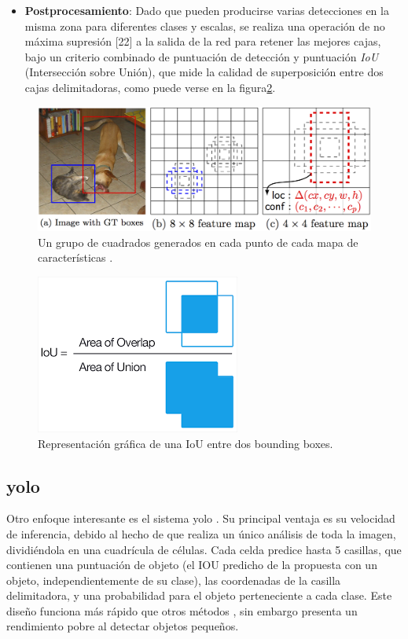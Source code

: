\begin{itemize}
  \item \textbf{Postprocesamiento}: Dado que pueden producirse varias detecciones en la misma zona para diferentes clases y escalas, se realiza una operación de no máxima supresión [22] a la salida de la red para retener las mejores cajas, bajo un criterio combinado de puntuación de detección y puntuación \textit{IoU} (Intersección sobre Unión), que mide la calidad de superposición entre dos cajas delimitadoras, como puede verse en la figura\ref{fig:2_iou}.
\end{itemize}

\begin{figure}[h]
	\centering
	\includegraphics[width=0.7\linewidth]{figures/estado_arte/ssd_generated_boxes.png}
	\caption{Un grupo de cuadrados generados en cada punto de cada mapa de características \cite{ssd}.}
	\label{fig:2_ssd_generated_boxes}
\end{figure}

\begin{figure}[h]
	\centering
	\includegraphics[width=0.4\linewidth]{figures/estado_arte/iou.png}
	\caption{Representación gráfica de una IoU entre dos bounding boxes.}
	\label{fig:2_iou}
\end{figure}

\subsection*{\acrfull{yolo}}
Otro enfoque interesante es el sistema \acrfull{yolo} \cite{yolov1}. Su principal ventaja es su velocidad de inferencia, debido al hecho de que realiza un único análisis de toda la imagen, dividiéndola en una cuadrícula de células. Cada celda predice hasta 5 casillas, que contienen una puntuación de objeto (el IOU predicho de la propuesta con un objeto, independientemente de su clase), las coordenadas de la casilla delimitadora, y una probabilidad para el objeto perteneciente a cada clase. Este diseño funciona más rápido que otros métodos \cite{yolov1}, sin embargo presenta un rendimiento pobre al detectar objetos pequeños. \\

